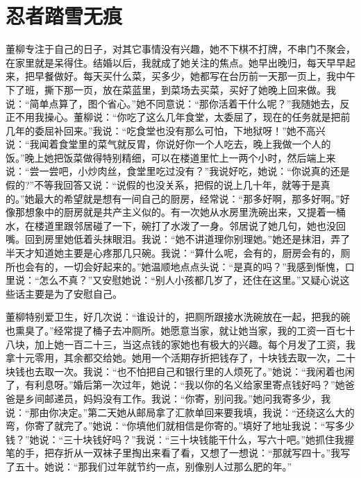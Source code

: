 \documentclass[12pt,oneside]{book}
\begin{document}
\chapter{忍者踏雪无痕}

董柳专注于自己的日子，对其它事情没有兴趣，她不下棋不打牌，不串门不聚会，在家里就是呆得住。结婚以后，我就成了她关注的焦点。她早出晚归，每天早早起来，把早餐做好。每天买什么菜，买多少，她都写在台历前一天那一页上，我中午下了班，撕下那一页，放在菜蓝里，到菜场去买菜，买好了她晚上回来做。我说：``简单点算了，图个省心。''她不同意说：``那你活着干什么呢？''我随她去，反正不用我操心。董柳说：``你吃了这么几年食堂，太委屈了，现在的任务就是把前几年的委屈补回来。''我说：``吃食堂也没有那么可怕，下地狱呀！''她不高兴说：``我闻着食堂里的菜气就反胃，你说好你一个人吃去，晚上我做一个人的饭。''晚上她把饭菜做得特别精细，可以在楼道里忙上一两个小时，然后端上来说：``尝一尝吧，小炒肉丝，食堂里吃过没有？''我说好吃，她说：``你说真的还是假的?''不等我回答又说：``说假的也没关系，把假的说上几十年，就等于是真的。''她最大的希望就是想有一间自己的厨房，经常说：``那多好啊，那多好啊。''好像那想象中的厨房就是共产主义似的。有一次她从水房里洗碗出来，又提着一桶水，在楼道里跟邻居碰了一下，碗打了水泼了一身。邻居说了她几句，她也没回嘴。回到房里她低着头抹眼泪。我说：``她不讲道理你别理她。''她还是抹泪，弄了半天才知道她主要是心疼那几只碗。我说：``算什么呢，会有的，厨房会有的，厕所也会有的，一切会好起来的。''她温顺地点点头说：``是真的吗？''我感到惭愧，口里说：``怎么不真？''又安慰她说：``别人小孩都几岁了，还住在这里。''又疑心说这些话主要是为了安慰自己。

董柳特别爱卫生，好几次说：``谁设计的，把厕所跟接水洗碗放在一起，把我的碗也熏臭了。''经常提了桶子去冲厕所。她愿意当家，就让她当家，我的工资一百七十八块，加上她一百二十三，当这点钱的家她也有极大的兴趣。每个月发了工资，我拿十元零用，其余都交给她。她用一个活期存折把钱存了，十块钱去取一次，二十块钱也去取一次。我说：``也不怕把自己和银行里的人烦死了。''她说：``我闲着也闲了，有利息呀。''婚后第一次过年，她说：``我以你的名义给家里寄点钱好吗？''她爸爸是乡间邮递员，妈妈没有工作。我说：``你寄，别问我。''她问我寄多少，我说：``那由你决定。''第二天她从邮局拿了汇款单回来要我填，我说：``还绕这么大的弯，你寄了就完了。''她说：``你填他们就相信是你寄的。''填好了地址我说：``写多少钱？''她说：``三十块钱好吗？''我说：``三十块钱能干什么，写六十吧。''她抓住我握笔的手，把存折从一双袜子里掏出来看了看，又想了一想说：``那就写四十。''我写了五十。她说：``那我们过年就节约一点，别像别人过那么肥的年。''
\end{document}
